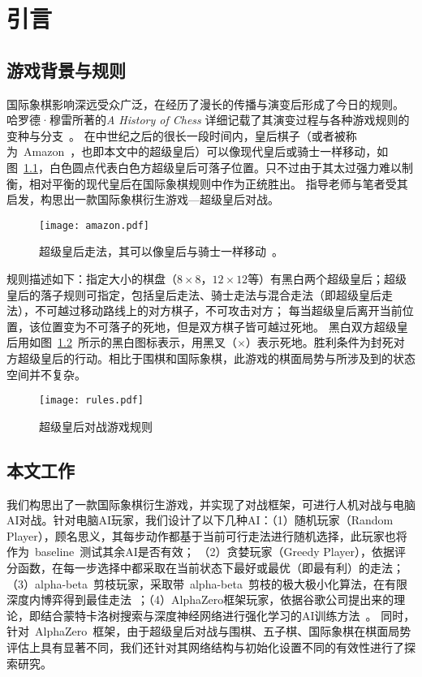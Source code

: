 \chapter{引言}
\label{chap:introduction}

\section{游戏背景与规则}
国际象棋影响深远受众广泛，在经历了漫长的传播与演变后形成了今日的规则。
哈罗德·穆雷所著的\textit{A History of Chess} 详细记载了其演变过程与各种游戏规则的变种与分支~\cite{murray2015history}。
在中世纪之后的很长一段时间内，皇后棋子（或者被称为~Amazon~，也即本文中的超级皇后）可以像现代皇后或骑士一样移动，如图~\ref{fig:superQueen}，白色圆点代表白色方超级皇后可落子位置。只不过由于其太过强力难以制衡，相对平衡的现代皇后在国际象棋规则中作为正统胜出。
指导老师与笔者受其启发，构思出一款国际象棋衍生游戏—超级皇后对战。
\begin{figure}[htb]
  \centering
  \texttt{[image: amazon.pdf]}
  \caption[superQueen]{%
    超级皇后走法，其可以像皇后与骑士一样移动~\cite{wikiAmazon}。}
  \label{fig:superQueen}
\end{figure}
规则描述如下：指定大小的棋盘（$8\times8$，$12\times12$等）有黑白两个超级皇后；超级皇后的落子规则可指定，包括皇后走法、骑士走法与混合走法（即超级皇后走法），不可越过移动路线上的对方棋子，不可攻击对方；
每当超级皇后离开当前位置，该位置变为不可落子的死地，但是双方棋子皆可越过死地。
黑白双方超级皇后用如图~\ref{fig:superQueenRules}~所示的黑白图标表示，用黑叉（$\mathbf{\times}$）表示死地。胜利条件为封死对方超级皇后的行动。相比于围棋和国际象棋，此游戏的棋面局势与所涉及到的状态空间并不复杂。

\begin{figure}[htb]
    \centering
    \texttt{[image: rules.pdf]}
    \caption[superQueenRules]{%
      超级皇后对战游戏规则%
      }
    \label{fig:superQueenRules}
  \end{figure}


\section{本文工作}
我们构思出了一款国际象棋衍生游戏，并实现了对战框架，可进行人机对战与电脑AI对战。针对电脑AI玩家，我们设计了以下几种AI：（1）随机玩家（Random Player），顾名思义，其每步动作都基于当前可行走法进行随机选择，此玩家也将作为~baseline~测试其余AI是否有效；
（2）贪婪玩家（Greedy Player），依据评分函数，在每一步选择中都采取在当前状态下最好或最优（即最有利）的走法；（3）alpha-beta~剪枝玩家，采取带~alpha-beta~剪枝的极大极小化算法，在有限深度内博弈得到最佳走法~\cite{russell2010artificial}；（4）AlphaZero框架玩家，依据谷歌公司提出来的理论，即结合蒙特卡洛树搜索与深度神经网络进行强化学习的AI训练方法~\cite{Silver1140}。
同时，针对~AlphaZero~框架，由于超级皇后对战与围棋、五子棋、国际象棋在棋面局势评估上具有显著不同，我们还针对其网络结构与初始化设置不同的有效性进行了探索研究。

